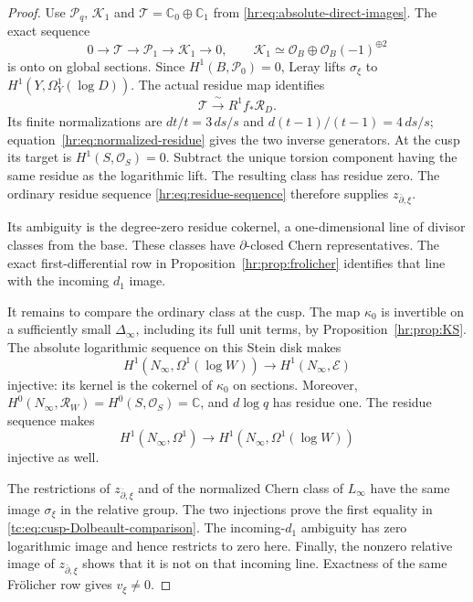 \begin{proof}
Use $\mathcal P_q$, $\mathcal K_1$ and
$\mathcal T=\mathbb C_0\oplus\mathbb C_1$ from
\eqref{hr:eq:absolute-direct-images}.
The exact sequence
\[
 0\longrightarrow\mathcal T\longrightarrow\mathcal P_1
        \longrightarrow\mathcal K_1\longrightarrow0,
 \qquad
 \mathcal K_1\simeq\mathcal O_B\oplus\mathcal O_B(-1)^{\oplus2}
\]
is onto on global sections. Since $H^1(B,\mathcal P_0)=0$,
Leray lifts $\sigma_\xi$ to
$H^1(Y,\Omega_Y^1(\log D))$.
The actual residue map identifies
\[
                 \mathcal T\xrightarrow{\ \sim\ }
                              R^1f_*\mathcal R_D.
\]
Its finite normalizations are
$dt/t=3\,ds/s$ and $d(t-1)/(t-1)=4\,ds/s$;
equation~\eqref{hr:eq:normalized-residue} gives the two inverse
generators. At the cusp its target is
$H^1(S,\mathcal O_S)=0$.
Subtract the unique torsion component having the same residue
as the logarithmic lift. The resulting class has residue zero.
The ordinary residue sequence \eqref{hr:eq:residue-sequence}
therefore supplies $z_{\bar\partial,\xi}$.

Its ambiguity is the degree-zero residue cokernel, a
one-dimensional line of divisor classes from the base.
These classes have $\partial$-closed Chern representatives.
The exact first-differential row in
Proposition~\ref{hr:prop:frolicher} identifies that line with
the incoming $d_1$ image.

It remains to compare the ordinary class at the cusp.
The map $\kappa_0$ is invertible on a sufficiently small
$\Delta_\infty$, including its full unit terms, by
Proposition~\ref{hr:prop:KS}.
The absolute logarithmic sequence on this Stein disk makes
\begin{equation}\label{tc:eq:first-cusp-injection}
 H^1(N_\infty,\Omega^1(\log W))
       \longrightarrow H^1(N_\infty,\mathscr E)
\end{equation}
injective: its kernel is the cokernel of $\kappa_0$ on
sections. Moreover,
$H^0(N_\infty,\mathcal R_W)=H^0(S,\mathcal O_S)=\mathbb C$,
and $d\log q$ has residue one. The residue sequence makes
\begin{equation}\label{tc:eq:second-cusp-injection}
 H^1(N_\infty,\Omega^1)
       \longrightarrow H^1(N_\infty,\Omega^1(\log W))
\end{equation}
injective as well.

The restrictions of $z_{\bar\partial,\xi}$ and of the
normalized Chern class of $L_\infty$ have the same image
$\sigma_\xi$ in the relative group.
The two injections prove the first equality in
\eqref{tc:eq:cusp-Dolbeault-comparison}.
The incoming-$d_1$ ambiguity has zero logarithmic image and
hence restricts to zero here.
Finally, the nonzero relative image of $z_{\bar\partial,\xi}$
shows that it is not on that incoming line.
Exactness of the same Fr\"olicher row gives $v_\xi\ne0$.
\end{proof}

